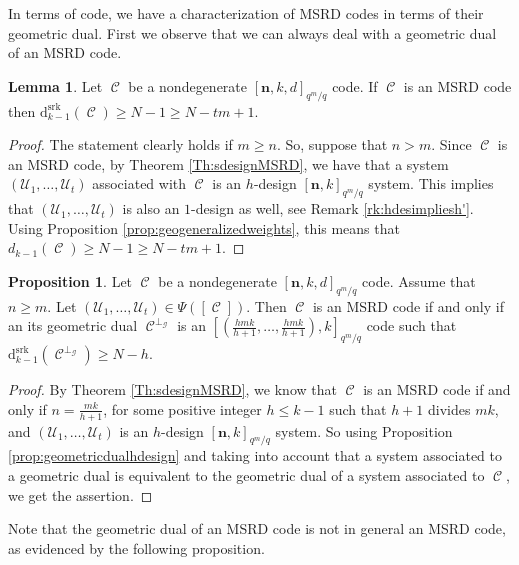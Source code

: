 \documentclass[11pt]{amsart}
\DeclareMathOperator{\C}{\mathcal{C}}
\theoremstyle{definition}
\newtheorem{lemma}[theorem]{Lemma}
\newtheorem{proposition}[theorem]{Proposition}
\newcommand{\ds}{\mathrm{d}^{\mathrm{srk}}}
\newcommand{\bfn}{\mathbf {n}}
\newcommand{\Fmnkd}{[\bfn,k,d]_{q^m/q}}
\begin{document}
{In terms of code, we have a characterization of MSRD codes in terms of their geometric dual. First we observe that we can always deal with a geometric dual of an MSRD code.

\begin{lemma}
    Let $\C$ be a nondegenerate $\Fmnkd$ code. If $\C$ is an MSRD code then $\ds_{k-1}(\C) \geq N-1 \geq N-tm+1$. 
\end{lemma}

\begin{proof}
    The statement clearly holds if $m \geq n$. So, suppose that $n >m$. Since $\C$ is an MSRD code, by Theorem \ref{Th:sdesignMSRD}, we have that a system $(\mathcal{U}_1,\ldots,\mathcal{U}_t)$ associated with $\C$ is an $h$-design $[\bfn,k]_{q^m/q}$ system. This implies that $(\mathcal{U}_1,\ldots,\mathcal{U}_t)$ is also an $1$-design as well, see Remark \ref{rk:hdesimpliesh'}. Using Proposition \ref{prop:geogeneralizedweights}, this means that $d_{k-1}(\C) \geq N-1 \geq N-tm+1$.
\end{proof}

\begin{proposition} %
Let $\C$ be a nondegenerate $\Fmnkd$ code. Assume that $n \geq m$. Let $(\mathcal{U}_1,\ldots,\mathcal{U}_t) \in \Psi([\C])$. Then $\C$ is an MSRD code if and only if an its geometric dual $\C^{\perp_{\mathcal{G}}}$ is an $\left[\left(\frac{hmk}{h+1},\ldots,\frac{hmk}{h+1} \right),k \right]_{q^m/q}$ code such that $\ds_{k-1}(\C^{\perp_{\mathcal{G}}}) \geq N-h$.
\end{proposition}

\begin{proof}
    By Theorem \ref{Th:sdesignMSRD}, we know that $\C$ is an MSRD code if and only if $n=\frac{mk}{h+1}$, for some positive integer $h \leq k-1$ such that $h+1$ divides $mk$, and $(\mathcal{U}_1,\ldots,\mathcal{U}_t)$ is an $h$-design $[\bfn,k]_{q^m/q}$ system. So using Proposition \ref{prop:geometricdualhdesign} and taking into account that a system associated to a geometric dual is equivalent to the geometric dual of a system associated to $\C$, we get the assertion.
\end{proof}



Note that the geometric dual of an MSRD code is not in general an MSRD code, as evidenced by the following proposition.

}
\end{document}
